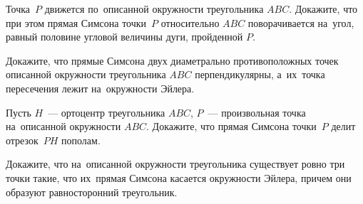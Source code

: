 \begin{problems}
\item
Точка~$P$ движется по~описанной окружности треугольника $ABC$.
Докажите, что при этом прямая Симсона точки~$P$ относительно $ABC$
поворачивается на~угол, равный половине угловой величины дуги, пройденной $P$.

\item
Докажите, что прямые Симсона двух диаметрально противоположных точек описанной
окружности треугольника $ABC$ перпендикулярны, а~их~точка пересечения лежит
на~окружности Эйлера.

\item
Пусть $H$~--- ортоцентр треугольника $ABC$,
$P$~--- произвольная точка на~описанной окружности $ABC$.
Докажите, что прямая Симсона точки~$P$ делит отрезок~$PH$ пополам.

\item
Докажите, что на~описанной окружности треугольника существует ровно три точки
такие, что их~прямая Симсона касается окружности Эйлера, причем они образуют
равносторонний треугольник.
 
\end{problems}

